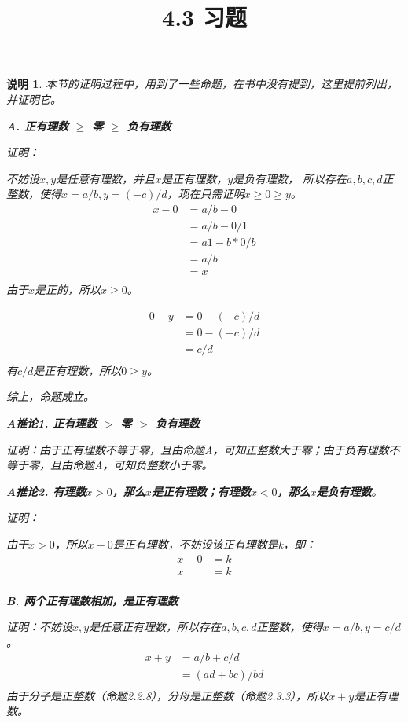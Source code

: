 \documentclass{article}
\theoremstyle{mystyle}
\newtheorem*{zremark}{说明}
\begin{document}
\title{4.3 习题}
\maketitle

\begin{zgraytheorem}
  \begin{zremark}
    本节的证明过程中，用到了一些命题，在书中没有提到，这里提前列出，并证明它。

    \textbf{A. 正有理数 $\geq$ 零 $\geq$ 负有理数}

    证明：

    不妨设$x,y$是任意有理数，并且$x$是正有理数，$y$是负有理数，
    所以存在$a,b,c,d$正整数，使得$x=a/b,y=(-c)/d$，现在只需证明$x \geq 0 \geq y$。
    \begin{align*}
      x - 0 & = a/b - 0   \\
            & = a/b - 0/1 \\
            & = a1-b*0/b  \\
            & = a / b     \\
            & = x         \\
    \end{align*}
    由于$x$是正的，所以$x \geq 0$。

    \begin{align*}
      0 - y & = 0 - (-c)/d \\
            & = 0 - (-c)/d \\
            & = c/d        \\
    \end{align*}
    有$c/d$是正有理数，所以$0 \geq y$。

    综上，命题成立。

    \textbf{A推论1. 正有理数 $>$ 零 $>$ 负有理数}

    证明：由于正有理数不等于零，且由命题A，可知正整数大于零；由于负有理数不等于零，且由命题A，可知负整数小于零。

    \textbf{A推论2. 有理数$x>0$，那么$x$是正有理数；有理数$x < 0$，那么$x$是负有理数}。

    证明：

    由于$x>0$，所以$x-0$是正有理数，不妨设该正有理数是k，即：
    \begin{align*}
      x-0 & = k \\
      x   & = k \\
    \end{align*}

    \textbf{B. 两个正有理数相加，是正有理数}

    证明：不妨设$x,y$是任意正有理数，所以存在$a,b,c,d$正整数，使得$x=a/b,y=c/d$。
    \begin{align*}
      x + y & = a/b + c/d      \\
            & = (ad + bc) / bd \\
    \end{align*}
    由于分子是正整数（命题2.2.8），分母是正整数（命题2.3.3），所以$x+y$是正有理数。


  \end{zremark}
\end{zgraytheorem}
\end{document}
